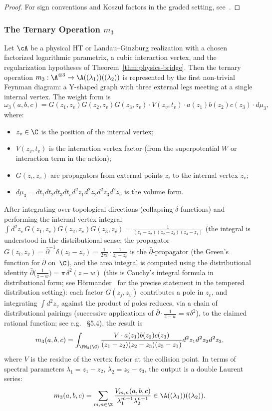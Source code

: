 \begin{proof}
For sign conventions and Koszul factors in the graded setting, see~\cite[Section 4]{CDG20}.
\end{proof}
\subsubsection{\texorpdfstring{The Ternary Operation $m_3$}{The Ternary Operation m3}}
\begin{proposition}
\label{prop:m3_formula}
Let\/ $\cA$ be a physical HT or Landau--Ginzburg realization with a
chosen factorized logarithmic parametrix, a cubic interaction vertex,
and the regularization hypotheses of Theorem~\ref{thm:physics-bridge}.
Then the ternary operation $m_3 : \A^{\otimes 3} \to
\A((\lambda_1))((\lambda_2))$ is represented by the first non-trivial
Feynman diagram: a Y-shaped graph with three external legs meeting at a
single internal vertex. The weight form is
\[
\omega_3(a, b, c) = G(z_1, z_v) G(z_2, z_v) G(z_3, z_v) \cdot V(z_v, t_v) \cdot a(z_1) b(z_2) c(z_3) \cdot d\mu_3,
\]
where:
\begin{itemize}
\item $z_v \in \C$ is the position of the internal vertex;
\item $V(z_v, t_v)$ is the interaction vertex factor (from the superpotential $W$ or interaction term in the action);
\item $G(z_i, z_v)$ are propagators from external points $z_i$ to the internal vertex $z_v$;
\item $d\mu_3 = dt_1 dt_2 dt_3 dt_v d^2z_1 d^2z_2 d^2z_3 d^2z_v$ is the volume form.
\end{itemize}

After integrating over topological directions (collapsing $\delta$-functions) and performing the internal vertex integral
$\int d^2z_v\, G(z_1,z_v)G(z_2,z_v)G(z_3,z_v) = \tfrac{1}{(z_1-z_2)(z_2-z_3)(z_3-z_1)}$
(the integral is understood in the distributional sense: the propagator $G(z_i, z_v) = \bar\partial^{-1}\delta(z_i - z_v) = \frac{1}{2\pi i} \cdot \frac{1}{z_i - z_v}$ is the $\bar\partial$-propagator (the Green's function for $\bar\partial$ on~$\C$), and the area integral is computed using the distributional identity $\bar\partial\bigl(\frac{1}{z-w}\bigr) = \pi\,\delta^2(z-w)$ (this is Cauchy's integral formula in distributional form; see H\"ormander~\cite[Theorem~1.4.1]{Hormander90} for the precise statement in the tempered distribution setting): each factor $G(z_j, z_v)$ contributes a pole in $z_v$, and integrating $\int d^2z_v$ against the product of poles reduces, via a chain of distributional pairings (successive applications of $\bar\partial \cdot \frac{1}{z-w} = \pi\delta^2$), to the claimed rational function; see e.g.\ \cite{CG17} \S5.4), the result is
\[
m_3(a,b,c) = \int_{\FM_3(\C)} \frac{V \cdot a(z_1) b(z_2) c(z_3)}{(z_1 - z_2)(z_2 - z_3)(z_3 - z_1)} d^2z_1 d^2z_2 d^2z_3,
\]
where $V$ is the residue of the vertex factor at the collision point.
In terms of spectral parameters $\lambda_1 = z_1 - z_2$, $\lambda_2 = z_2 - z_3$, the output is a double Laurent series:
\[
m_3(a,b,c) = \sum_{m,n \in \Z} \frac{V_{m,n}(a,b,c)}{\lambda_1^{m+1} \lambda_2^{n+1}} \in \A((\lambda_1))((\lambda_2)).
\]
\end{proposition}
